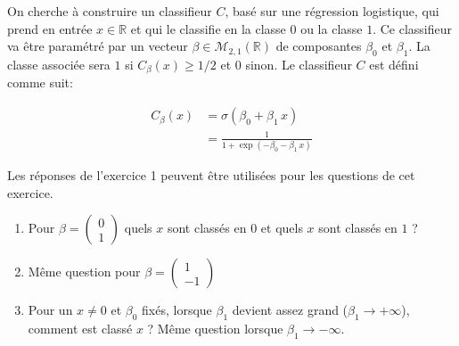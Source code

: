 \documentclass[solutions]{../exercices}
\begin{document}
\begin{exercice}
On cherche à construire un classifieur $C$, basé sur une régression logistique, qui prend en entrée $x \in \mathbb{R}$ et qui le classifie en la classe $0$ ou la classe $1$. Ce classifieur va être paramétré par un vecteur $\beta \in \mathcal{M}_{2,1}(\mathbb{R})$ de composantes $\beta_0$ et $\beta_1$. La classe associée sera $1$ si $C_{\beta}(x) \ge 1/2$ et $0$ sinon. Le classifieur $C$ est défini comme suit:

\begin{equation}
	\begin{aligned}
		C_{\beta}(x) &= \sigma \left(\beta_0 + \beta_1 \, x\right) \\
		             &= \frac{1}{ 1 + \exp{\left(- \beta_0 - \beta_1 \, x\right)}}
	\end{aligned}
	\nonumber
\end{equation}

Les réponses de l'exercice 1 peuvent être utilisées pour les questions de cet exercice.

\begin{enumerate}
	\item Pour $\beta = \begin{pmatrix}0 \\ 1\end{pmatrix}$ quels $x$ sont classés en $0$ et quels $x$ sont classés en $1$ ?
	\item Même question pour $\beta = \begin{pmatrix}1 \\ -1\end{pmatrix}$
	\item Pour un $x \ne 0$ et $\beta_0$ fixés, lorsque $\beta_1$ devient assez grand ($\beta_1 \to + \infty$), comment est classé $x$ ? Même question lorsque $\beta_1 \to -\infty$.
\end{enumerate}
\end{exercice}
\end{document}
